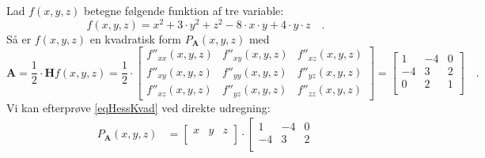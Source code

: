 \begin{example} \label{exampKvadAH}
Lad $f(x,y,z)$ betegne følgende funktion af tre variable:
\begin{equation}
f(x,y,z) = x^{2} + 3\cdot y^{2} + z^{2} - 8\cdot x \cdot y + 4\cdot y\cdot z \quad.
\end{equation}
Så er $f(x,y,z)$ en kvadratisk form $P_{\mathbf{A}}(x,y,z)$ med \begin{equation}
\mathbf{A}  = \frac{1}{2}\cdot \mathbf{H}f(x,y,z) =  \frac{1}{2}\cdot\left[
                                             \begin{array}{ccc}
                                               f''_{xx}(x,y,z) & f''_{xy}(x,y,z)  & f''_{xz}(x,y,z)  \\
f''_{xy}(x,y,z)  & f''_{yy}(x,y,z)  & f''_{yz}(x,y,z)  \\
f''_{xz}(x,y,z) & f''_{yz}(x,y,z)  &  f''_{zz}(x,y,z)
                                             \end{array}
                                           \right]  = \left[
                                                        \begin{array}{ccc}
                                                          1 & -4 & 0 \\
                                                          -4 & 3 & 2 \\
                                                          0 & 2 & 1 \\
                                                        \end{array}
                                                      \right]
                                           \quad .
\end{equation}
Vi kan efterprøve  \ref{eqHessKvad} ved direkte udregning:
\begin{equation}
\begin{aligned}
P_{\mathbf{A}}(x,y,z) &= \left[
                          \begin{array}{ccc}
                            x & y & z \\
                          \end{array}
                        \right] \cdot
                                                     \left[   \begin{array}{ccc}
                                                          1 & -4 & 0 \\
                                                          -4 & 3 & 2 \\

\end{array}
\end{aligned}
\end{equation}
\end{example}
